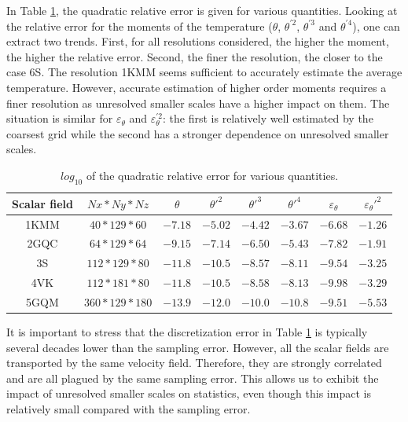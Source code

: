 \documentclass[review]{elsarticle}
\newcommand{\epst}{\varepsilon_\theta}
\begin{document}
In Table \ref{tb-error}, the quadratic relative error is given for various quantities. Looking at the relative error for the moments of the temperature ($\theta$, $\theta^{\prime2}$, $\theta^{\prime3}$ and $\theta^{\prime4}$), one can extract two trends. First, for all resolutions considered, the higher the moment, the higher the relative error. Second, the finer the resolution, the closer to the case 6S. The resolution 1KMM seems sufficient to accurately estimate the average temperature. However, accurate estimation of higher order moments requires a finer resolution as {\color{red}unresolved} smaller scales have a higher impact on them. The situation is similar for $\epst$ and $\epst^{\prime2}$: the first is relatively well estimated by the coarsest grid while the second has a stronger dependence on {\color{red}unresolved} smaller scales.

\begin{table}
\begin{center}
\begin{tabular}{|c|c|c|c|c|c|c|c|}
\hline
Scalar field & $Nx*Ny*Nz$ & $\theta$ & $\theta'^2$ & $\theta'^3$ & $\theta'^4$ & $\epst$ & $\epst'^2$ \\
\hline
1KMM & $40*129*60$ & $-7.18$ & $-5.02$ & $-4.42$ & $-3.67$ & $-6.68$ & $-1.26$ \\
\hline
2GQC & $64*129*64$ & $-9.15$ & $-7.14$ & $-6.50$ & $-5.43$ & $-7.82$ & $-1.91$ \\
\hline
3S & $112*129*80$ & $-11.8$ & $-10.5$ & $-8.57$ & $-8.11$ & $-9.54$ & $-3.25$ \\
\hline
4VK & $112*181*80$ & $-11.8$ & $-10.5$ & $-8.58$ & $-8.13$ & $-9.98$ & $-3.29$ \\
\hline
5GQM & $360*129*180$ & $-13.9$ & $-12.0$ & $-10.0$ & $-10.8$ & $-9.51$ & $-5.53$ \\
\hline
\end{tabular}
\end{center}
\caption{$log_{10}$ of the quadratic relative error for various quantities.}
\label{tb-error}
\end{table}

It is important to stress that the discretization error in Table \ref{tb-error} is typically several decades lower than the sampling error. However, all the scalar fields are transported by the same velocity field. Therefore, they are strongly correlated and are all plagued by the same sampling error. This allows us to exhibit the impact of {\color{red}unresolved} smaller scales on statistics, even though this impact is relatively small compared with the sampling error.
\end{document}
